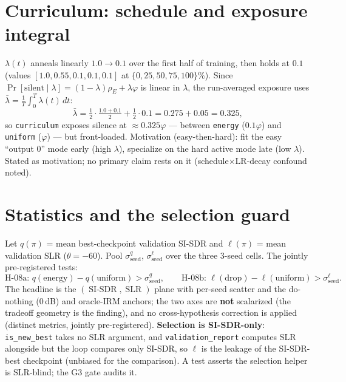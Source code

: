 \documentclass[11pt]{article}
\newcommand{\code}[1]{\texttt{#1}}
\DeclareMathOperator{\SISDR}{SI\text{-}SDR}
\DeclareMathOperator{\SLR}{SLR}
\begin{document}
\section{Curriculum: schedule and exposure integral}
$\lambda(t)$ anneals linearly $1.0\to 0.1$ over the first half of training, then holds at
$0.1$ (values $[1.0,0.55,0.1,0.1,0.1]$ at $\{0,25,50,75,100\}\%$). Since
$\Pr[\text{silent}\mid\lambda]=(1-\lambda)\rho_E+\lambda\varphi$ is linear in $\lambda$,
the run-averaged exposure uses $\bar\lambda=\frac1T\int_0^T\lambda(t)\,dt$:
\begin{equation}
\bar\lambda = \tfrac12\cdot\tfrac{1.0+0.1}{2} + \tfrac12\cdot 0.1 = 0.275+0.05 = 0.325,
\end{equation}
so \code{curriculum} exposes silence at $\approx 0.325\varphi$ --- between \code{energy}
($0.1\varphi$) and \code{uniform} ($\varphi$) --- but front-loaded. Motivation
(easy-then-hard): fit the easy ``output $0$'' mode early (high $\lambda$), specialize on
the hard active mode late (low $\lambda$). Stated as motivation; no primary claim rests on
it (schedule$\times$LR-decay confound noted).

\section{Statistics and the selection guard}
Let $q(\pi)$ = mean best-checkpoint validation SI-SDR and $\ell(\pi)$ = mean validation SLR
($\theta=-60$). Pool $\sigma^q_{\text{seed}}$, $\sigma^\ell_{\text{seed}}$ over the three
$3$-seed cells. The jointly pre-registered tests:
\[
\text{H-08a: } q(\text{energy})-q(\text{uniform}) > \sigma^q_{\text{seed}}, \qquad
\text{H-08b: } \ell(\text{drop})-\ell(\text{uniform}) > \sigma^\ell_{\text{seed}}.
\]
The headline is the $(\SISDR,\SLR)$ plane with per-seed scatter and the do-nothing
($0$\,dB) and oracle-IRM anchors; the two axes are \textbf{not} scalarized (the tradeoff
geometry is the finding), and no cross-hypothesis correction is applied (distinct metrics,
jointly pre-registered). \textbf{Selection is SI-SDR-only}: \code{is\_new\_best} takes no
SLR argument, and \code{validation\_report} computes SLR alongside but the loop compares
only SI-SDR, so $\ell$ is the leakage of the SI-SDR-best checkpoint (unbiased for the
comparison). A test asserts the selection helper is SLR-blind; the G3 gate audits it.
\end{document}
